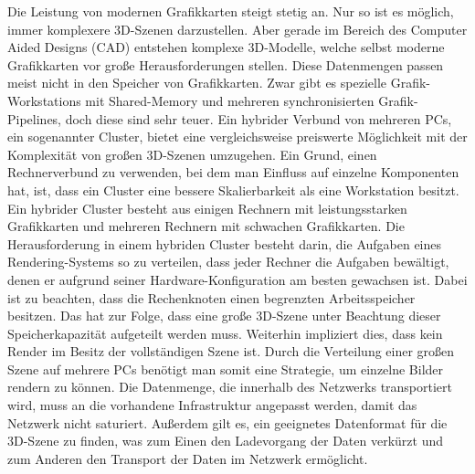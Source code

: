 Die Leistung von modernen Grafikkarten steigt stetig an. Nur so ist es möglich, immer komplexere 3D-Szenen darzustellen. Aber gerade im Bereich des Computer Aided Designs (CAD) entstehen komplexe 3D-Modelle, welche selbst moderne Grafikkarten vor große Herausforderungen stellen. Diese Datenmengen passen meist nicht in den Speicher von Grafikkarten. Zwar gibt es spezielle Grafik-Workstations mit Shared-Memory und mehreren synchronisierten Grafik-Pipelines, doch diese sind sehr teuer. Ein hybrider Verbund von mehreren PCs, ein sogenannter Cluster, bietet eine vergleichsweise preiswerte Möglichkeit mit der Komplexität von großen 3D-Szenen umzugehen. Ein Grund, einen Rechnerverbund zu verwenden, bei dem man Einfluss auf einzelne Komponenten hat, ist, dass ein Cluster eine bessere Skalierbarkeit als eine Workstation besitzt.\\
Ein hybrider Cluster besteht aus einigen Rechnern mit leistungsstarken Grafikkarten und mehreren Rechnern mit schwachen Grafikkarten. Die Herausforderung in einem hybriden Cluster besteht darin, die Aufgaben eines Rendering-Systems so zu verteilen, dass jeder Rechner die Aufgaben bewältigt, denen er aufgrund seiner Hardware-Konfiguration am besten gewachsen ist. Dabei ist zu beachten, dass die Rechenknoten einen begrenzten Arbeitsspeicher besitzen. Das hat zur Folge, dass eine große 3D-Szene unter Beachtung dieser Speicherkapazität aufgeteilt werden muss. Weiterhin impliziert dies, dass kein Render im Besitz der vollständigen Szene ist. Durch die Verteilung einer großen Szene auf mehrere PCs benötigt man somit eine Strategie, um einzelne Bilder rendern zu können. Die Datenmenge, die innerhalb des Netzwerks transportiert wird, muss an die vorhandene Infrastruktur angepasst werden, damit das Netzwerk nicht saturiert. Außerdem gilt es, ein geeignetes Datenformat für die 3D-Szene zu finden, was zum Einen den Ladevorgang der Daten verkürzt und zum Anderen den Transport der Daten im Netzwerk ermöglicht.

